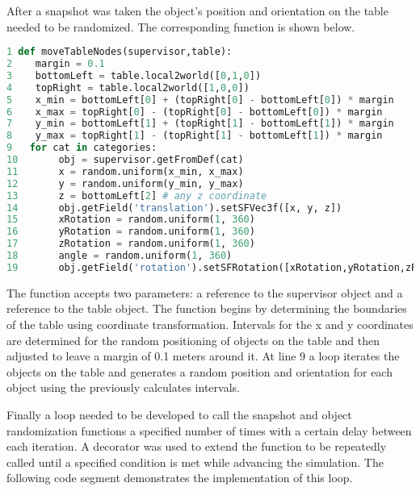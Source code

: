 After a snapshot was taken the object's position and orientation on the table needed to be randomized. The corresponding function is shown below.

\begin{lstlisting}[language=python]
1 def moveTableNodes(supervisor,table):
2    margin = 0.1
3    bottomLeft = table.local2world([0,1,0])
4    topRight = table.local2world([1,0,0])
5    x_min = bottomLeft[0] + (topRight[0] - bottomLeft[0]) * margin
6    x_max = topRight[0] - (topRight[0] - bottomLeft[0]) * margin
7    y_min = bottomLeft[1] + (topRight[1] - bottomLeft[1]) * margin
8    y_max = topRight[1] - (topRight[1] - bottomLeft[1]) * margin
9   for cat in categories:
10       obj = supervisor.getFromDef(cat)
11       x = random.uniform(x_min, x_max)
12       y = random.uniform(y_min, y_max)
13       z = bottomLeft[2] # any z coordinate
14       obj.getField('translation').setSFVec3f([x, y, z])
15       xRotation = random.uniform(1, 360)
16       yRotation = random.uniform(1, 360)
17       zRotation = random.uniform(1, 360)
18       angle = random.uniform(1, 360)
19       obj.getField('rotation').setSFRotation([xRotation,yRotation,zRotation,angle])

\end{lstlisting}
The function accepts two parameters: a reference to the supervisor object and a reference to the table object. The function begins by determining the boundaries of the table using coordinate transformation. Intervals for the x and y coordinates are determined for the random positioning of objects on the table and then adjusted to leave a margin of 0.1 meters around it. At line 9 a loop iterates the objects on the table and generates a random position and orientation for each object using the previously calculates intervals.

Finally a loop needed to be developed to call the snapshot and object randomization functions a specified number of times with a certain delay between each iteration. A decorator was used to extend the function to be repeatedly called until a specified condition is met while advancing the simulation. The following code segment demonstrates the implementation of this loop. 

